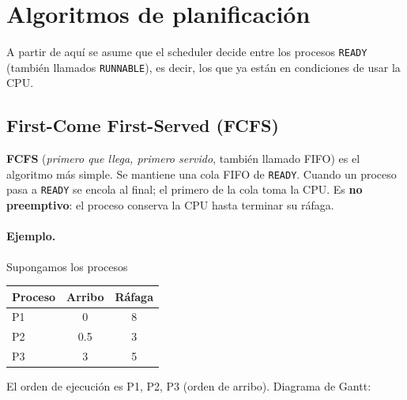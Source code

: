 \documentclass[11pt,a4paper]{article}
\begin{document}
\section{Algoritmos de planificación}

A partir de aquí se asume que el scheduler decide entre los procesos
\texttt{READY} (también llamados \texttt{RUNNABLE}), es decir, los
que ya están en condiciones de usar la CPU.

\subsection{First-Come First-Served (FCFS)}

\begin{definicion}
\textbf{FCFS} (\emph{primero que llega, primero servido}, también
llamado FIFO) es el algoritmo más simple. Se mantiene una cola FIFO
de \texttt{READY}. Cuando un proceso pasa a \texttt{READY} se encola
al final; el primero de la cola toma la CPU. Es \textbf{no
preemptivo}: el proceso conserva la CPU hasta terminar su ráfaga.
\end{definicion}

\paragraph{Ejemplo.} Supongamos los procesos
\begin{center}\small
\begin{tabular}{@{}lcc@{}}\toprule
Proceso & Arribo & Ráfaga \\\midrule
P1 & 0 & 8 \\
P2 & 0.5 & 3 \\
P3 & 3 & 5 \\\bottomrule
\end{tabular}
\end{center}

El orden de ejecución es P1, P2, P3 (orden de arribo). Diagrama de
Gantt:

\begin{center}
\end{center}
\end{document}
